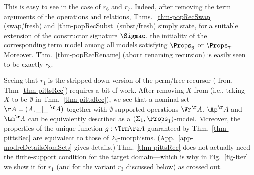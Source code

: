 This is easy to see in the case of $r_6$ and $r_7$.  Indeed, after removing the term arguments of the operations and relations,  
 Thms.~\ref{thm-popRecSwap} (swap/fresh) and \ref{thm-popRecSubst} (subst/fresh) 
  simply state, for a suitable extension of the constructor signature $\Sigmac$, the initiality of the corresponding term model %
  among
all models satisfying $\Props_6$ or $\Props_7$. %
%
Moreover, Thm.~\ref{thm-popRecRename} (about renaming recursion) is easily seen to %
be exactly $r_8$.  

   
Seeing that $r_1$ is the stripped down version of the 
perm/free recursor (%
from Thm~\ref{thm-pittsRec}) requires a bit of work. %
After removing $X$ from (i.e.,  taking $X$ to be $\emptyset$ in Thm.~\ref{thm-pittsRec}),  
we see that 
a nominal set $\AA = (A,\_[\_]^\AA)$ together with $\emptyset$-supported operations 
$\Vr^\AA$, %
$\Ap^\AA$ %
and $\Lm^\AA$ %
can be equivalently described as a $(\Sigma_1,\Props_1)$-model. 
Moreover, the properties of the unique function $g:\Trm \ra A$ 
guaranteed by Thm.~\ref{thm-pittsRec} are equivalent to those of 
$\Sigma_i$-morphisms. (App.~\ref{app-modreDetailsNomSets}   
 gives %
details.)
%
Thm.~\ref{thm-pittsRec} does not actually 
need 
the finite-support condition \FSupFv{} for the target domain---which is why in Fig.~\ref{fig-iter} we show it for $r_1$ (and for the variant $r_3$ discussed below) as crossed out. %
%

